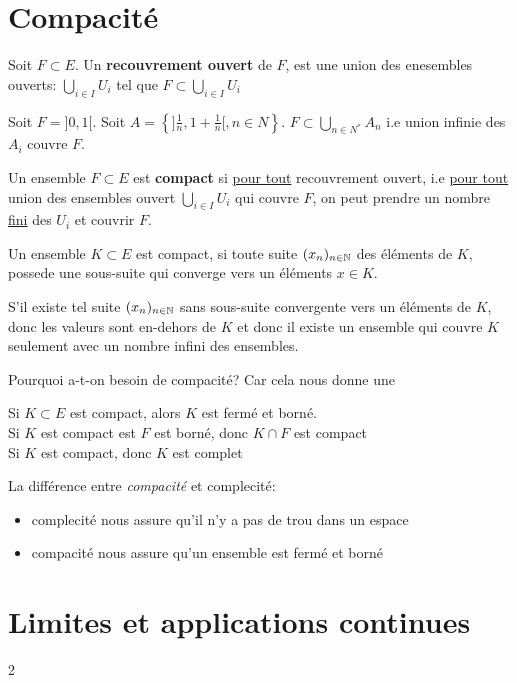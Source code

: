\section{Compacité}
\begin{definition}
    Soit $F \subset E$. Un \textbf{recouvrement ouvert} de $F$, est une union des enesembles ouverts:  $\bigcup_{i \in I} U_i$ tel que $F \subset \bigcup_{i \in I} U_i$
\end{definition}
\begin{eg}
    Soit $F = ]0, 1[$. Soit $A = \left\{]\frac{1}{n}, 1 + \frac{1}{n}[, n \in N\right\}$. $F \subset \bigcup_{n \in N^{*}} A_n$ i.e union infinie des $A_i$ couvre $F$.
\end{eg}
\begin{definition}
    Un ensemble $F \subset E$ est \textbf{compact} si \underline{pour tout} recouvrement ouvert, i.e \underline{pour tout} union des ensembles ouvert $\bigcup_{i \in I} U_i$ qui couvre $F$, on peut prendre un nombre \underline{fini} des  $U_i$ et couvrir $F$.
\end{definition}
\begin{theorem}
    Un ensemble $K \subset E$ est compact, si toute suite $(x_n)_{n \in \mathbb{N}}$ des éléments de $K$, possede une sous-suite qui converge  vers un éléments $x \in K$.
\end{theorem}
\begin{intuition}
    S'il existe tel suite $(x_n)_{n \in \mathbb{N}}$ sans sous-suite convergente vers un éléments de  $K$, donc les valeurs sont en-dehors de  $K$ et donc il existe un ensemble qui couvre $K$  seulement avec un nombre infini des ensembles. 
\end{intuition}
Pourquoi a-t-on besoin de compacité? Car cela nous donne une
\begin{prop}
    Si $K \subset E$ est compact, alors $K$ est fermé et borné.\\
    Si $K$ est compact est  $F$ est borné, donc  $K \cap F$ est compact\\
    Si $K$ est compact, donc  $K$ est complet
\end{prop}
\begin{property}
    La différence entre \textit{compacité} et {complecité}:
    \begin{itemize}
        \item complecité nous assure qu'il n'y a pas de trou dans un espace
        \item compacité nous assure qu'un ensemble est fermé et borné
    \end{itemize}
\end{property}
\section{Limites et applications continues}
2

